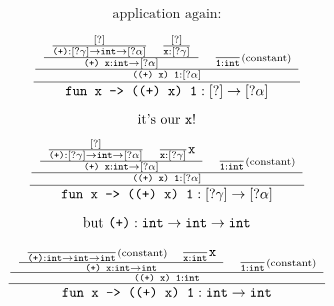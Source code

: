 \documentclass{article}
\newcommand{\tmverbatim}[1]{\text{{\ttfamily{#1}}}}
\begin{document}
{\newpage}

{\LARGE{\[ \text{application again:} \]}}

{\newpage}

{\LARGE{\[ \frac{\frac{\begin{array}{ll}
     \frac{\begin{array}{ll}
       \frac{[?]}{\text{\tmverbatim{(+)}} : [? \gamma] \rightarrow
       \text{\tmverbatim{int}} \rightarrow [? \alpha]} &
       \frac{[?]}{\text{\tmverbatim{x}} : [? \gamma]}
     \end{array}}{\text{\tmverbatim{(+) x}} : \text{\tmverbatim{int}}
     \rightarrow [? \alpha]} & \frac{}{\text{\tmverbatim{1}} :
     \text{\tmverbatim{int}}} \scriptsize{\text{(constant)}}
   \end{array}}{\text{\tmverbatim{((+) x) 1}} : [?
   \alpha]}}{\text{\tmverbatim{fun x -> ((+) x) 1}} : [?] \rightarrow [?
   \alpha]} \]}}

{\newpage}

{\LARGE{\[ \text{it's our \tmverbatim{x}!} \]}}

{\newpage}

{\LARGE{\[ \frac{\frac{\begin{array}{ll}
     \frac{\begin{array}{ll}
       \frac{[?]}{\text{\tmverbatim{(+)}} : [? \gamma] \rightarrow
       \text{\tmverbatim{int}} \rightarrow [? \alpha]} &
       \frac{}{\text{\tmverbatim{x}} : [? \gamma]} \text{\tmverbatim{x}}
     \end{array}}{\text{\tmverbatim{(+) x}} : \text{\tmverbatim{int}}
     \rightarrow [? \alpha]} & \frac{}{\text{\tmverbatim{1}} :
     \text{\tmverbatim{int}}} \scriptsize{\text{(constant)}}
   \end{array}}{\text{\tmverbatim{((+) x) 1}} : [?
   \alpha]}}{\text{\tmverbatim{fun x -> ((+) x) 1}} : [? \gamma] \rightarrow
   [? \alpha]} \]}}

{\newpage}

{\LARGE{\[ \text{but \tmverbatim{(+)}} : \text{\tmverbatim{int}} \rightarrow
   \text{\tmverbatim{int}} \rightarrow \text{\tmverbatim{int}} \]}}

{\newpage}

{\LARGE{\[ \frac{\frac{\begin{array}{ll}
     \frac{\begin{array}{ll}
       \frac{}{\text{\tmverbatim{(+)}} : \text{\tmverbatim{int}} \rightarrow
       \text{\tmverbatim{int}} \rightarrow \text{\tmverbatim{int}}}
       \scriptsize{\text{(constant)}} & \frac{}{\text{\tmverbatim{x}} :
       \text{\tmverbatim{int}}} \text{\tmverbatim{x}}
     \end{array}}{\text{\tmverbatim{(+) x}} : \text{\tmverbatim{int}}
     \rightarrow \text{\tmverbatim{int}}} & \frac{}{\text{\tmverbatim{1}} :
     \text{\tmverbatim{int}}} \scriptsize{\text{(constant)}}
   \end{array}}{\text{\tmverbatim{((+) x) 1}} :
   \text{\tmverbatim{int}}}}{\text{\tmverbatim{fun x -> ((+) x) 1}} :
   \text{\tmverbatim{int}} \rightarrow \text{\tmverbatim{int}}} \]}}

\
\end{document}
